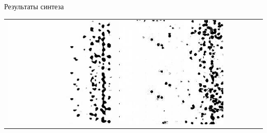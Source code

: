 \documentclass[12pt]{beamer}
\begin{document}
\begin{frame}{Результаты синтеза}
\begin{table}
\begin{center}
\begin{tabular}{p{1.2cm} p{1.2cm} p{1.2cm} p{1.2cm} p{1.2cm} p{1.2cm} p{1.2cm}}
					\includegraphics[width=1\linewidth]{8-results/sand-trend2/nf16_woUnet/gen2}
					&
					\includegraphics[width=1\linewidth]{8-results/sand-trend2/nf32/gen2}
					\\

\end{tabular}
\end{center}
\end{table}
\end{frame}
\end{document}
